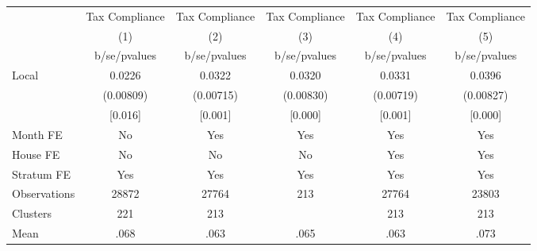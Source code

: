 {
\def\sym#1{\ifmmode^{#1}\else\(^{#1}\)\fi}
\begin{tabular}{l*{5}{c}}
\toprule
                &\multicolumn{1}{c}{Tax Compliance}&\multicolumn{1}{c}{Tax Compliance}&\multicolumn{1}{c}{Tax Compliance}&\multicolumn{1}{c}{Tax Compliance}&\multicolumn{1}{c}{Tax Compliance}\\
                &\multicolumn{1}{c}{(1)}&\multicolumn{1}{c}{(2)}&\multicolumn{1}{c}{(3)}&\multicolumn{1}{c}{(4)}&\multicolumn{1}{c}{(5)}\\
                &b/se/pvalues&b/se/pvalues&b/se/pvalues&b/se/pvalues&b/se/pvalues\\
\midrule
Local           &   0.0226&   0.0322&   0.0320&   0.0331&   0.0396\\
                &(0.00809)&(0.00715)&(0.00830)&(0.00719)&(0.00827)\\
                &  [0.016]&  [0.001]&  [0.000]&  [0.001]&  [0.000]\\
Month FE        &       No&      Yes&      Yes&      Yes&      Yes\\
House FE        &       No&       No&       No&      Yes&      Yes\\
Stratum FE      &      Yes&      Yes&      Yes&      Yes&      Yes\\
\midrule
Observations    &    28872&    27764&      213&    27764&    23803\\
Clusters        &      221&      213&         &      213&      213\\
Mean            &     .068&     .063&     .065&     .063&     .073\\
\bottomrule
\end{tabular}
}
